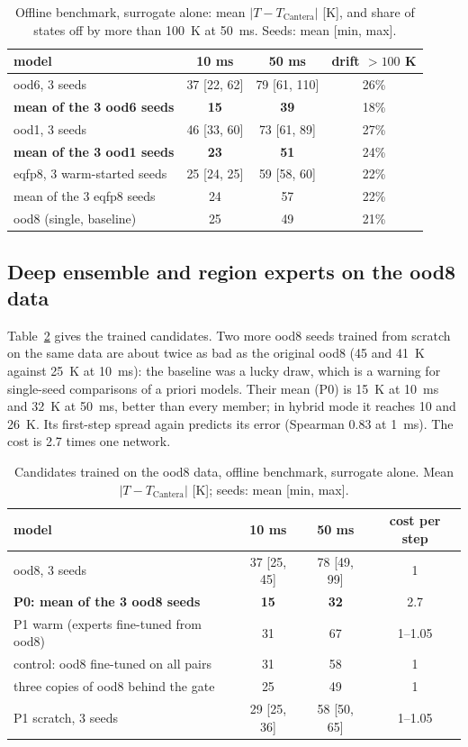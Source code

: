 \documentclass[preprint,review,12pt]{elsarticle}
\begin{document}
\begin{table}[t]
\centering
\caption{Offline benchmark, surrogate alone: mean $|T-T_\mathrm{Cantera}|$ [K], and share of states off by
more than 100~K at 50~ms. Seeds: mean [min, max].}
\label{tab:e0}
\begin{tabular}{lccc}
\toprule
model & 10 ms & 50 ms & drift $>100$ K \\
\midrule
ood6, 3 seeds & 37 [22, 62] & 79 [61, 110] & 26\% \\
\textbf{mean of the 3 ood6 seeds} & \textbf{15} & \textbf{39} & 18\% \\
ood1, 3 seeds & 46 [33, 60] & 73 [61, 89] & 27\% \\
\textbf{mean of the 3 ood1 seeds} & \textbf{23} & \textbf{51} & 24\% \\
eqfp8, 3 warm-started seeds & 25 [24, 25] & 59 [58, 60] & 22\% \\
mean of the 3 eqfp8 seeds & 24 & 57 & 22\% \\
ood8 (single, baseline) & 25 & 49 & 21\% \\
\bottomrule
\end{tabular}
\end{table}

\subsection{Deep ensemble and region experts on the ood8 data}
Table~\ref{tab:e3} gives the trained candidates. Two more ood8 seeds trained from scratch on the same
data are about twice as bad as the original ood8 (45 and 41~K against 25~K at 10~ms): the baseline was a
lucky draw, which is a warning for single-seed comparisons of a priori models. Their mean (P0) is 15~K at
10~ms and 32~K at 50~ms, better than every member; in hybrid mode it reaches 10 and 26~K. Its first-step
spread again predicts its error (Spearman 0.83 at 1~ms). The cost is 2.7 times one network.

\begin{table}[t]
\centering
\caption{Candidates trained on the ood8 data, offline benchmark, surrogate alone. Mean
$|T-T_\mathrm{Cantera}|$ [K]; seeds: mean [min, max].}
\label{tab:e3}
\begin{tabular}{lccc}
\toprule
model & 10 ms & 50 ms & cost per step \\
\midrule
ood8, 3 seeds & 37 [25, 45] & 78 [49, 99] & 1 \\
\textbf{P0: mean of the 3 ood8 seeds} & \textbf{15} & \textbf{32} & 2.7 \\
P1 warm (experts fine-tuned from ood8) & 31 & 67 & 1--1.05 \\
control: ood8 fine-tuned on all pairs & 31 & 58 & 1 \\
three copies of ood8 behind the gate & 25 & 49 & 1 \\
P1 scratch, 3 seeds & 29 [25, 36] & 58 [50, 65] & 1--1.05 \\
\bottomrule
\end{tabular}
\end{table}
\end{document}
